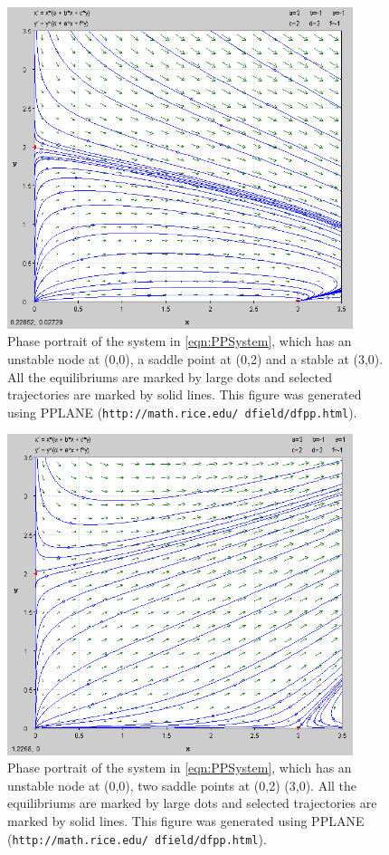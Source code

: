 \documentclass[a4paper,twocolumn]{article} %
\begin{document}
\begin{figure}[p] %
  \begin{center}
    \includegraphics[width = 0.9\textwidth, height = 0.5\textwidth]{2-1}
  \end{center}
  \caption{Phase portrait of the system in \eqref{eqn:PPSystem}, which has an unstable node at \mbox{(0,0)}, a saddle point at \mbox{(0,2)} and a stable at \mbox{(3,0)}. All the equilibriums are marked by large dots and selected trajectories are marked by solid lines. This figure was generated using PPLANE (\texttt{http://math.rice.edu/~dfield/dfpp.html}).}
  \label{fig:pplane2}
\end{figure}

\begin{figure}[p] %
  \begin{center}
    \includegraphics[width = 0.9\textwidth, height = 0.5\textwidth]{21}
  \end{center}
  \caption{Phase portrait of the system in \eqref{eqn:PPSystem}, which has an unstable node at \mbox{(0,0)}, two saddle points at \mbox{(0,2)} \mbox{(3,0)}. All the equilibriums are marked by large dots and selected trajectories are marked by solid lines. This figure was generated using PPLANE (\texttt{http://math.rice.edu/~dfield/dfpp.html}).}
  \label{fig:pplane2}
\end{figure}
\end{document}
